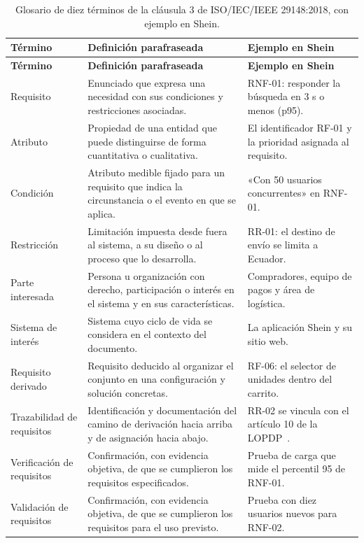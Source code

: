 \documentclass[11pt,a4paper]{article}
\begin{document}
\begin{longtable}{>{\raggedright\arraybackslash}p{3.0cm}
                  >{\raggedright\arraybackslash}p{6.4cm}
                  >{\raggedright\arraybackslash}p{5.4cm}}
\caption{Glosario de diez términos de la cláusula 3 de ISO/IEC/IEEE
29148:2018, con ejemplo en Shein.}
\label{tab:glosario}\\
\toprule
\textbf{Término} & \textbf{Definición parafraseada} & \textbf{Ejemplo en Shein} \\
\midrule
\endfirsthead
\toprule
\textbf{Término} & \textbf{Definición parafraseada} & \textbf{Ejemplo en Shein} \\
\midrule
\endhead
\bottomrule
\endfoot
Requisito & Enunciado que expresa una necesidad con sus condiciones y restricciones asociadas. & RNF-01: responder la búsqueda en 3 s o menos (p95). \\
Atributo & Propiedad de una entidad que puede distinguirse de forma cuantitativa o cualitativa. & El identificador RF-01 y la prioridad asignada al requisito. \\
Condición & Atributo medible fijado para un requisito que indica la circunstancia o el evento en que se aplica. & «Con 50 usuarios concurrentes» en RNF-01. \\
Restricción & Limitación impuesta desde fuera al sistema, a su diseño o al proceso que lo desarrolla. & RR-01: el destino de envío se limita a Ecuador. \\
Parte interesada & Persona u organización con derecho, participación o interés en el sistema y en sus características. & Compradores, equipo de pagos y área de logística. \\
Sistema de interés & Sistema cuyo ciclo de vida se considera en el contexto del documento. & La aplicación Shein y su sitio web. \\
Requisito derivado & Requisito deducido al organizar el conjunto en una configuración y solución concretas. & RF-06: el selector de unidades dentro del carrito. \\
Trazabilidad de requisitos & Identificación y documentación del camino de derivación hacia arriba y de asignación hacia abajo. & RR-02 se vincula con el artículo 10 de la LOPDP~\cite{lopdp2021}. \\
Verificación de requisitos & Confirmación, con evidencia objetiva, de que se cumplieron los requisitos especificados. & Prueba de carga que mide el percentil 95 de RNF-01. \\
Validación de requisitos & Confirmación, con evidencia objetiva, de que se cumplieron los requisitos para el uso previsto. & Prueba con diez usuarios nuevos para RNF-02. \\
\end{longtable}
\end{document}
